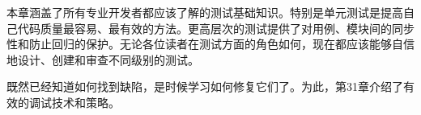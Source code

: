 本章涵盖了所有专业开发者都应该了解的测试基础知识。特别是单元测试是提高自己代码质量最容易、最有效的方法。更高层次的测试提供了对用例、模块间的同步性和防止回归的保护。无论各位读者在测试方面的角色如何，现在都应该能够自信地设计、创建和审查不同级别的测试。

既然已经知道如何找到缺陷，是时候学习如何修复它们了。为此，第31章介绍了有效的调试技术和策略。